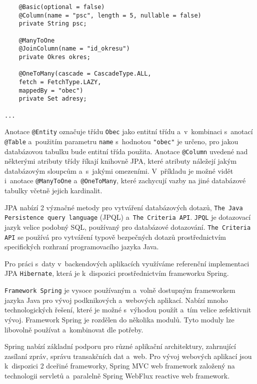 \documentclass[twoside, 12pt]{article}
\begin{document}
{\begin{lstlisting}
    @Basic(optional = false)
    @Column(name = "psc", length = 5, nullable = false)
    private String psc;

    @ManyToOne
    @JoinColumn(name = "id_okresu")
    private Okres okres;

    @OneToMany(cascade = CascadeType.ALL,
    fetch = FetchType.LAZY,
    mappedBy = "obec")
    private Set adresy;

...

\end{lstlisting}

Anotace \texttt{@Entity} označuje třídu \texttt{Obec}
jako entitní třídu a~v~kombinaci s~anotací \texttt{@Table}
a~použitím parametru \texttt{name} s~hodnotou \texttt{"obec"}
je určeno, pro jakou databázovou tabulku bude entitní třída použita.
Anotace \texttt{@Column} uvedené nad některými atributy třídy
říkají knihovně JPA, které atributy náležejí jakým databázovým sloupcům a~s~jakými omezeními.
V~příkladu je možné vidět i~anotace \texttt{@ManyToOne} a~\texttt{@OneToMany},
které zachycují vazby na jiné databázové tabulky včetně jejich kardinalit.

JPA nabízí 2 význačné metody pro vytváření databázových dotazů,
\texttt{The Java Persistence query language} (JPQL) a~\texttt{The Criteria API}.
\texttt{JPQL} je dotazovací jazyk velice podobný SQL, používaný pro databázové dotazování.
\texttt{The Criteria API} se používá pro vytváření typově bezpečných dotazů
prostřednictvím specifických rozhraní programovacího jazyka Java.
\cite{oracleJPA}

Pro práci s~daty v~backendových aplikacích využíváme referenční implementaci
JPA \texttt{Hibernate}, která je k~dispozici prostřednictvím frameworku Spring.


\texttt{Framework Spring} je vysoce používaným a~volně dostupným frameworkem
jazyka Java pro vývoj podknikových a~webových aplikací.
Nabízí mnoho technologických řešení, které je možné s~výhodou
použít a~tím velice zefektivnit vývoj.
Framework Spring je rozdělen do několika modulů.
Tyto moduly lze libovolně používat a~kombinovat dle potřeby.

Spring nabízí základní podporu pro různé aplikační architektury,
zahrnující zasílaní zpráv, správu transakčních dat a~web.
Pro vývoj webových aplikací jsou k~dispozici 2 dceřiné frameworky,
Spring MVC web framework založený na technologii servletů
a~paralelně Spring WebFlux reactive web framework.

}
\end{document}
